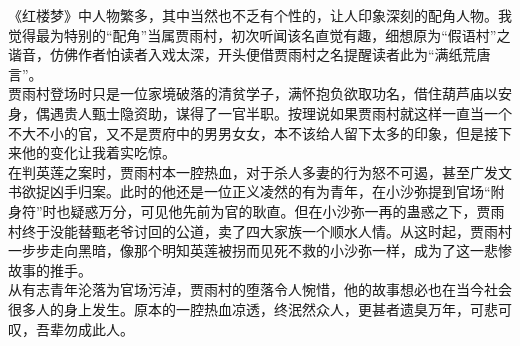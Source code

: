 %
\begin{solution}
    \large 《红楼梦》中人物繁多，其中当然也不乏有个性的，让人印象深刻的配角人物。我觉得最为特别的“配角”当属贾雨村，初次听闻该名直觉有趣，细想原为“假语村”之谐音，仿佛作者怕读者入戏太深，开头便借贾雨村之名提醒读者此为“满纸荒唐言”。\\
    贾雨村登场时只是一位家境破落的清贫学子，满怀抱负欲取功名，借住葫芦庙以安身，偶遇贵人甄士隐资助，谋得了一官半职。按理说如果贾雨村就这样一直当一个不大不小的官，又不是贾府中的男男女女，本不该给人留下太多的印象，但是接下来他的变化让我着实吃惊。\\
    在判英莲之案时，贾雨村本一腔热血，对于杀人多妻的行为怒不可遏，甚至广发文书欲捉凶手归案。此时的他还是一位正义凌然的有为青年，在小沙弥提到官场“附身符”时也疑惑万分，可见他先前为官的耿直。但在小沙弥一再的蛊惑之下，贾雨村终于没能替甄老爷讨回的公道，卖了四大家族一个顺水人情。从这时起，贾雨村一步步走向黑暗，像那个明知英莲被拐而见死不救的小沙弥一样，成为了这一悲惨故事的推手。\\
    从有志青年沦落为官场污淖，贾雨村的堕落令人惋惜，他的故事想必也在当今社会很多人的身上发生。原本的一腔热血凉透，终泯然众人，更甚者遗臭万年，可悲可叹，吾辈勿成此人。
\end{solution}


%



%



%

